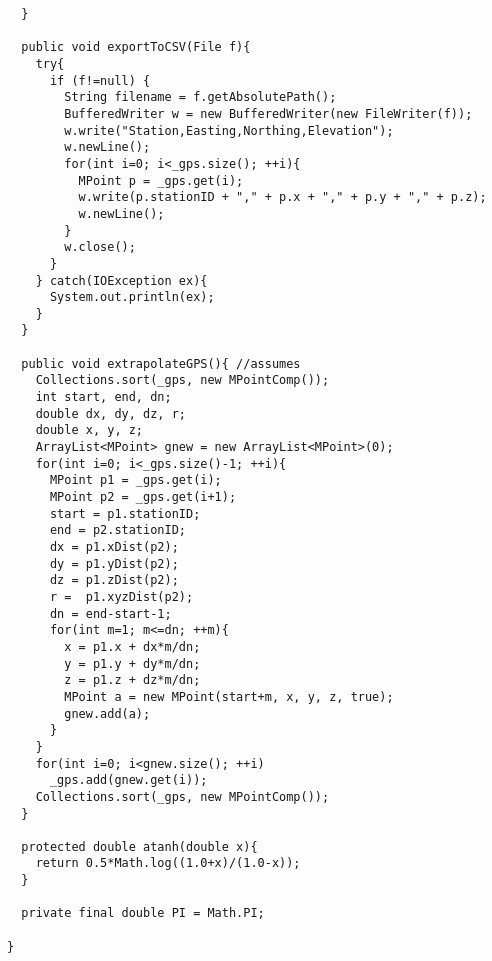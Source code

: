 \documentclass[11pt]{article}
\begin{document}
\begin{enumerate}
\begin{lstlisting}
  }

  public void exportToCSV(File f){
    try{
      if (f!=null) {
        String filename = f.getAbsolutePath();
        BufferedWriter w = new BufferedWriter(new FileWriter(f));
        w.write("Station,Easting,Northing,Elevation");
        w.newLine();
        for(int i=0; i<_gps.size(); ++i){
          MPoint p = _gps.get(i);
          w.write(p.stationID + "," + p.x + "," + p.y + "," + p.z);
          w.newLine();
        }
        w.close();
      }
    } catch(IOException ex){
      System.out.println(ex);  
    }
  }

  public void extrapolateGPS(){ //assumes 
    Collections.sort(_gps, new MPointComp());    
    int start, end, dn;
    double dx, dy, dz, r;
    double x, y, z;
    ArrayList<MPoint> gnew = new ArrayList<MPoint>(0);
    for(int i=0; i<_gps.size()-1; ++i){
      MPoint p1 = _gps.get(i);
      MPoint p2 = _gps.get(i+1);
      start = p1.stationID;
      end = p2.stationID;
      dx = p1.xDist(p2);
      dy = p1.yDist(p2);
      dz = p1.zDist(p2);
      r =  p1.xyzDist(p2);
      dn = end-start-1;
      for(int m=1; m<=dn; ++m){
        x = p1.x + dx*m/dn;
        y = p1.y + dy*m/dn;
        z = p1.z + dz*m/dn;
        MPoint a = new MPoint(start+m, x, y, z, true);
        gnew.add(a);
      }
    }
    for(int i=0; i<gnew.size(); ++i)
      _gps.add(gnew.get(i));
    Collections.sort(_gps, new MPointComp());
  }

  protected double atanh(double x){
    return 0.5*Math.log((1.0+x)/(1.0-x));
  }

  private final double PI = Math.PI;

}
\end{lstlisting}
\end{enumerate}
\end{document}
